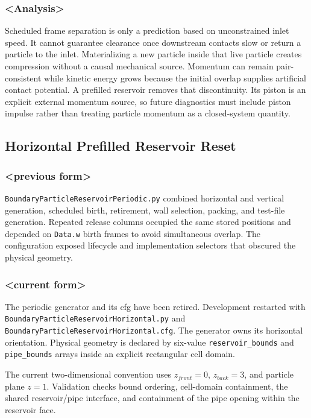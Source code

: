 \subsubsection{<Analysis>}

Scheduled frame separation is only a prediction based on unconstrained inlet
speed.  It cannot guarantee clearance once downstream contacts slow or return
a particle to the inlet.  Materializing a new particle inside that live
particle creates compression without a causal mechanical source.  Momentum
can remain pair-consistent while kinetic energy grows because the initial
overlap supplies artificial contact potential.  A prefilled reservoir removes
that discontinuity.  Its piston is an explicit external momentum source, so
future diagnostics must include piston impulse rather than treating particle
momentum as a closed-system quantity.

\subsection{Horizontal Prefilled Reservoir Reset}

\subsubsection{<previous form>}

\texttt{BoundaryParticleReservoirPeriodic.py} combined horizontal and vertical
generation, scheduled birth, retirement, wall selection, packing, and test-file
generation.  Repeated release columns occupied the same stored positions and
depended on \texttt{Data.w} birth frames to avoid simultaneous overlap.  The
configuration exposed lifecycle and implementation selectors that obscured
the physical geometry.

\subsubsection{<current form>}

The periodic generator and its cfg have been retired.  Development restarted
with \texttt{BoundaryParticleReservoirHorizontal.py} and
\texttt{BoundaryParticleReservoirHorizontal.cfg}.  The generator owns its
horizontal orientation.  Physical geometry is declared by six-value
\texttt{reservoir\_bounds} and \texttt{pipe\_bounds} arrays inside an explicit
rectangular cell domain.

The current two-dimensional convention uses $z_{front}=0$, $z_{back}=3$,
and particle plane $z=1$.  Validation checks bound ordering, cell-domain
containment, the shared reservoir/pipe interface, and containment of the pipe
opening within the reservoir face.

